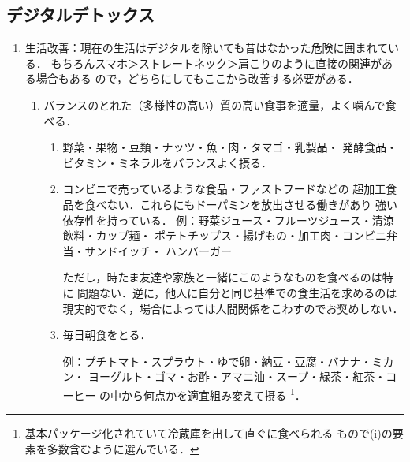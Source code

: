 \subsection{デジタルデトックス}
\begin{enumerate}
   \emptyline
   
   \item 
   生活改善：現在の生活はデジタルを除いても昔はなかった危険に囲まれている．
   もちろんスマホ＞ストレートネック＞肩こりのように直接の関連がある場合もある
   ので，どちらにしてもここから改善する必要がある．
   \begin{enumerate}
      \item 
      バランスのとれた（多様性の高い）質の高い食事を適量，よく噛んで食べる．
      \begin{enumerate}
         \item 
            野菜・果物・豆類・ナッツ・魚・肉・タマゴ・乳製品・
            発酵食品・ビタミン・ミネラルをバランスよく摂る．
         
         \item 
            コンビニで売っているような食品・ファストフードなどの
            超加工食品を食べない．これらにもドーパミンを放出させる働きがあり
            強い依存性を持っている．
            例：野菜ジュース・フルーツジュース・清涼飲料・カップ麺・
            ポテトチップス・揚げもの・加工肉・コンビニ弁当・サンドイッチ・
            ハンバーガー
            
            \emptyline				
            ただし，時たま友達や家族と一緒にこのようなものを食べるのは特に
            問題ない．逆に，他人に自分と同じ基準での食生活を求めるのは
            現実的でなく，場合によっては人間関係をこわすのでお奨めしない．
         
         \item 
            毎日朝食をとる．
            
            例：プチトマト・スプラウト・ゆで卵・納豆・豆腐・バナナ・ミカン・
            ヨーグルト・ゴマ・お酢・アマニ油・スープ・緑茶・紅茶・コーヒー
            の中から何点かを適宜組み変えて摂る
            \footnote{基本パッケージ化されていて冷蔵庫を出して直ぐに食べられる
            もので(i)の要素を多数含むように選んでいる．}．
      \end{enumerate}
   

\end{enumerate}
\end{enumerate}
